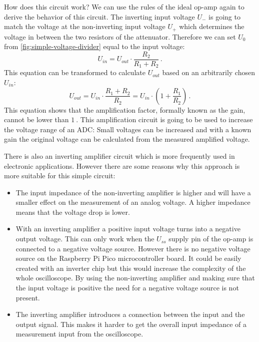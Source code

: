 How does this circuit work? We can use the rules of the ideal op-amp again to derive the behavior of this circuit. The inverting input voltage $U_-$ is going to match the voltage at the non-inverting input voltage $U_+$ which determines the voltage in between the two resistors of the attenuator. Therefore we can set $U_0$ from \cref{fig:simple-voltage-divider} equal to the input voltage:
\begin{equation}
	U_{in} = U_{out} \cdot \frac{R_2}{R_1 + R_2}\,.
\end{equation}
This equation can be transformed to calculate $U_{out}$ based on an arbitrarily chosen $U_{in}$:
\begin{equation}
	U_{out} = U_{in} \cdot \frac{R_1 + R_2}{R_2} = U_{in} \cdot \left( 1 + \frac{R_1}{R_2} \right)\,.
\end{equation}
This equation shows that the amplification factor, formally known as the \glqq{}gain\grqq{}, cannot be lower than $\SI{1}{}$. This amplification circuit is going to be used to increase the voltage range of an ADC: Small voltages can be increased and with a known gain the original voltage can be calculated from the measured amplified voltage.

There is also an \glqq{}inverting amplifier\grqq{} circuit which is more frequently used in electronic applications. However there are some reasons why this approach is more suitable for this simple circuit:
\begin{itemize}
	\item The input impedance of the non-inverting amplifier is higher and will have a smaller effect on the measurement of an analog voltage. A higher impedance means that the voltage drop is lower.
	\item With an inverting amplifier a positive input voltage turns into a negative output voltage. This can only work when the $U_{ss}$ supply pin of the op-amp is connected to a negative voltage source. However there is no negative voltage source on the Raspberry Pi Pico microcontroller board. It could be easily created with an inverter chip but this would increase the complexity of the whole oscilloscope. By using the non-inverting amplifier and making sure that the input voltage is positive the need for a negative voltage source is not present.
	\item The inverting amplifier introduces a connection between the input and the output signal. This makes it harder to get the overall input impedance of a measurement input from the oscilloscope.
\end{itemize}
